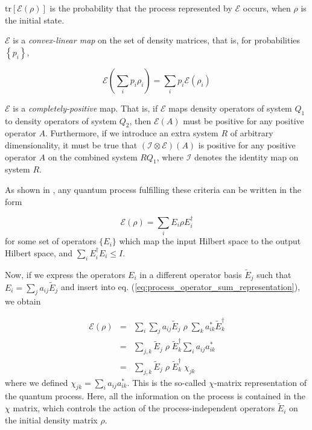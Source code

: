 \begin{axiom}
$\mathrm{tr}\left[\mathcal{E}(\rho)\right]$ is the probability that the process represented by $\mathcal{E}$ occurs, when $\rho$ is the initial state.
\end{axiom}

\begin{axiom}
$\mathcal{E}$ is a {\it convex-linear map} on the set of density matrices, that is, for probabilities $\left\{p_i\right\}$,

  \begin{equation}
	  \mathcal{E}\left(\sum\limits_i p_i \rho_i\right) = \sum\limits_i p_i \mathcal{E}(\rho_i)
	\end{equation}
\end{axiom}

\begin{axiom}
$\mathcal{E}$ is a {\it completely-positive} map. That is, if $\mathcal{E}$  maps density operators of system $Q_1$ to density operators of system $Q_2$, then $\mathcal{E}(A)$ must be positive for any positive operator $A$. Furthermore, if we introduce an extra system $R$ of arbitrary dimensionality, it must be true that $(\mathcal{I}\otimes \mathcal{E})(A)$ is positive for any positive operator $A$ on the combined system $RQ_1$, where $\mathcal{I}$ denotes the identity map on system $R$.
\end{axiom}
As shown in \cite{nielsen_quantum_2000}, any quantum process fulfilling these criteria can be written in the form

\begin{equation}
  \mathcal{E}(\rho) = \sum\limits_i E_i \rho E_i^\dagger \label{eq:process_operator_sum_representation}
\end{equation}
for some set of operators $\{ E_i \}$ which map the input Hilbert space to the output Hilbert space, and $\sum_i E_i^\dagger E_i \le I$.

Now, if we express the operators $E_i$ in a different operator basis $\tilde{E}_j$ such that $E_i = \sum_j a_{ij} \tilde{E}_{j}$ and insert into eq. (\ref{eq:process_operator_sum_representation}), we obtain

\begin{eqnarray}
 \mathcal{E}(\rho) & = & \sum\limits_i \sum\limits_j a_{ij} \tilde{E}_j \;\rho\; \sum\limits_k a_{ik}^* \tilde{E}_k^\dagger \\
& = & \sum\limits_{j,k}\tilde{E}_j \; \rho \; \tilde{E}_k^\dagger \sum\limits_i a_{ij} a_{ik}^* \\
& = & \sum\limits_{j,k}\tilde{E}_j \; \rho \; \tilde{E}_k^\dagger \; \chi_{jk} \label{eq:process_chi_representation}
\end{eqnarray}
where we defined $\chi_{jk} = \sum\limits_i a_{ij} a_{ik}^*$. This is the so-called $\chi$-matrix representation of the quantum process. Here, all the information on the process is contained in the $\chi$ matrix, which controls the action of the process-independent operators $\tilde{E}_i$ on the initial density matrix $\rho$.

